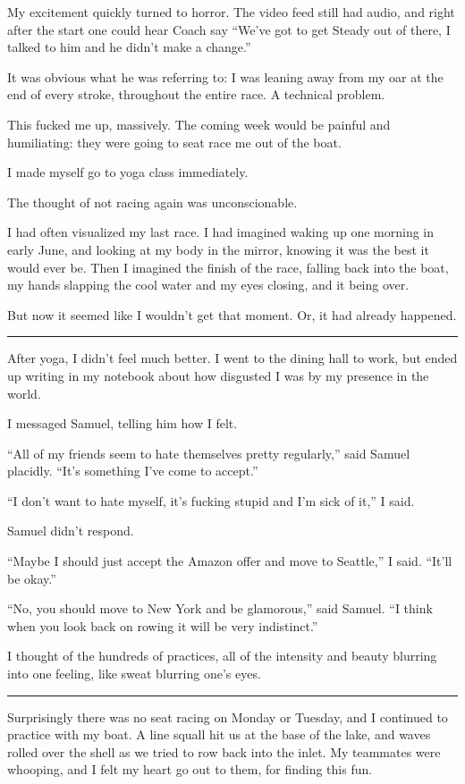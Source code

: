 My excitement quickly turned to horror.  The video feed still had audio, and
right after the start one could hear Coach say ``We've got to get Steady out of
there, I talked to him and he didn't make a change.''  

It was obvious what he was referring to: I was leaning away from my oar at the
end of every stroke, throughout the entire race.  A technical problem.

This fucked me up, massively.  The coming week would be painful and humiliating:
they were going to seat race me out of the boat.

I made myself go to yoga class immediately.  

The thought of not racing again was unconscionable.  

I had often visualized my last race.  I had imagined waking up one morning in
early June, and looking at my body in the mirror, knowing it was the best it
would ever be.  Then I imagined the finish of the race, falling back into the
boat, my hands slapping the cool water and my eyes closing, and it being over.

But now it seemed like I wouldn't get that moment.  Or, it had already happened.

\plainfancybreak{12pt}{2}{* * *}

After yoga, I didn't feel much better.  I went to the dining hall to work, but
ended up writing in my notebook about how disgusted I was by my presence in the
world.

I messaged Samuel, telling him how I felt.

``All of my friends seem to hate themselves pretty regularly,'' said Samuel
placidly.  ``It's something I've come to accept.''

``I don't want to hate myself, it's fucking stupid and I'm sick of it,'' I said.  

Samuel didn't respond.

``Maybe I should just accept the Amazon offer and move to Seattle,'' I said.
``It'll be okay.''

``No, you should move to New York and be glamorous,'' said Samuel.  ``I think
when you look back on rowing it will be very indistinct.'' 

I thought of the hundreds of practices, all of the intensity and beauty blurring
into one feeling, like sweat blurring one's eyes.

\plainfancybreak{12pt}{2}{* * *}

Surprisingly there was no seat racing on Monday or Tuesday, and I continued to
practice with my boat.  A line squall hit us at the base of the lake, and waves
rolled over the shell as we tried to row back into the inlet.  My teammates were
whooping, and I felt my heart go out to them, for finding this fun.

